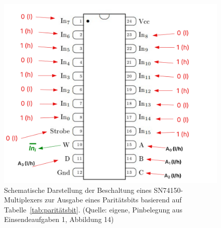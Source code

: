 \begin{figure}
    \centering
    \includegraphics[scale=0.5]{aufgabe 3/img/multiplexer.svg}
    \caption{Schematische Darstellung der Beschaltung eines SN74150-Multiplexers zur Ausgabe eines Paritätsbits basierend auf Tabelle~\ref{tab:paritätsbit}. (Quelle: eigene, Pinbelegung aus Einsendeaufgaben 1, Abbildung 14)}
    \label{fig:multiplexer}
\end{figure}
